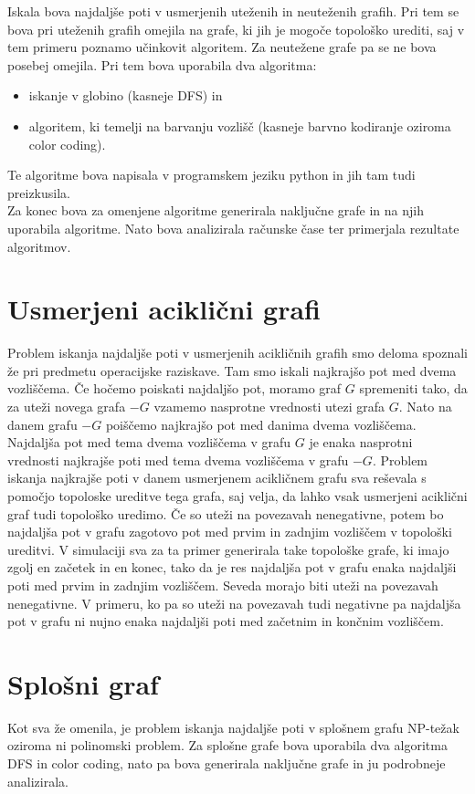 \documentclass[a4paper, 9pt]{article}
\begin{document}
Iskala bova najdaljše poti v usmerjenih uteženih in neuteženih grafih. Pri tem se bova pri uteženih grafih omejila na grafe, ki jih je mogoče topološko urediti, saj v tem primeru poznamo učinkovit algoritem. Za neutežene grafe pa se ne bova posebej omejila. Pri tem bova uporabila dva algoritma: 
\begin{itemize}
    \item iskanje v globino (kasneje DFS) in
    \item algoritem, ki temelji na barvanju vozlišč (kasneje barvno kodiranje oziroma color coding).
\end{itemize}

Te algoritme bova napisala v programskem jeziku python in jih tam tudi preizkusila.\\
Za konec bova za omenjene algoritme generirala naključne grafe in na njih uporabila algoritme. Nato bova analizirala računske čase ter primerjala rezultate algoritmov.

\section{Usmerjeni aciklični grafi}
Problem iskanja najdaljše poti v usmerjenih acikličnih grafih smo deloma spoznali že pri predmetu operacijske raziskave. Tam smo iskali najkrajšo pot med dvema vozliščema. Če hočemo poiskati najdaljšo pot, moramo graf $G$ spremeniti tako, da za uteži novega grafa $-G$ vzamemo nasprotne vrednosti utezi grafa $G$. Nato na danem grafu $-G$ poiščemo najkrajšo pot med danima dvema vozliščema. Najdaljša pot med tema dvema vozliščema v grafu $G$ je enaka nasprotni vrednosti najkrajše poti med tema dvema vozliščema v grafu $-G$. Problem iskanja najkrajše poti v danem usmerjenem acikličnem grafu sva reševala s pomočjo topoloske ureditve tega grafa, saj velja, da lahko vsak usmerjeni aciklični graf tudi topološko uredimo. Če so uteži na povezavah nenegativne, potem bo najdaljša pot v grafu zagotovo pot med prvim in zadnjim vozliščem v topološki ureditvi. V simulaciji sva za ta primer generirala take topološke grafe, ki imajo zgolj en začetek in en konec, tako da je res najdaljša pot v grafu enaka najdaljši poti med prvim in zadnjim vozliščem. Seveda morajo biti uteži na povezavah nenegativne. V primeru, ko pa so uteži na povezavah tudi negativne pa najdaljša pot v grafu ni nujno enaka najdaljši poti med začetnim in končnim vozliščem.

\section{Splošni graf}
Kot sva že omenila, je problem iskanja najdaljše poti v splošnem grafu NP-težak oziroma ni polinomski problem. Za splošne grafe bova uporabila dva algoritma DFS in color coding, nato pa bova generirala naključne grafe in ju podrobneje analizirala.
\end{document}
